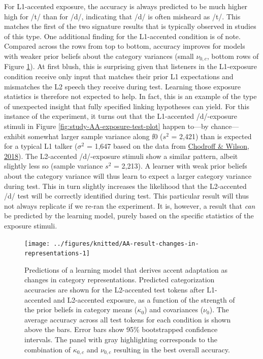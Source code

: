 \documentclass[
  11pt,
  man,floatsintext]{apa6}
\begin{document}
For L1-accented exposure, the accuracy is always predicted to be much higher high for /t/ than for /d/, indicating that /d/ is often misheard as /t/. This matches the first of the two signature results that is typically observed in studies of this type. One additional finding for the L1-accented condition is of note. Compared across the rows from top to bottom, accuracy improves for models with weaker prior beliefs about the category variances (small \(\nu_{0,c}\), bottom rows of Figure \ref{fig:AA-result-changes-in-representations}). At first blush, this is surprising given that listeners in the L1-exposure condition receive only input that matches their prior L1 expectations and mismatches the L2 speech they receive during test. Learning those exposure statistics is therefore not expected to help. In fact, this is an example of the type of unexpected insight that fully specified linking hypotheses can yield. For this instance of the experiment, it turns out that the L1-accented /d/-exposure stimuli in Figure \ref{fig:study-AA-exposure-test-plot} happen to---by chance---exhibit somewhat larger sample variance along f0 (\(s^2\) = 2,421) than is expected for a typical L1 talker (\(\sigma^2\) = 1,647 based on the data from \protect\hyperlink{ref-chodroff-wilson2018}{Chodroff \& Wilson, 2018}). The L2-accented /d/-exposure stimuli show a similar pattern, albeit slightly less so (sample variance \(s^2\) = 2,213). A learner with weak prior beliefs about the category variance will thus learn to expect a larger category variance during test. This in turn slightly increases the likelihood that the L2-accented /d/ test will be correctly identified during test. This particular result will thus not always replicate if we re-ran the experiment. It is, however, a result that \emph{can} be predicted by the learning model, purely based on the specific statistics of the exposure stimuli.



\begin{figure}

{\centering \texttt{[image: ../figures/knitted/AA-result-changes-in-representations-1]} 

}

\caption{Predictions of a learning model that derives accent adaptation as changes in category representations. Predicted categorization accuracies are shown for the L2-accented test tokens after L1-accented and L2-accented exposure, as a function of the strength of the prior beliefs in category means (\(\kappa_0\)) and covariances (\(\nu_0\)). The average accuracy across all test tokens for each condition is shown above the bars. Error bars show 95\% bootstrapped confidence intervals. The panel with gray highlighting corresponds to the combination of \(\kappa_{0,c}\) and \(\nu_{0,c}\) resulting in the best overall accuracy.}\label{fig:AA-result-changes-in-representations}
\end{figure}
\end{document}
